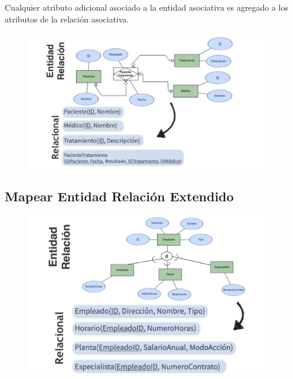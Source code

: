 \documentclass[12pt, fleqn]{report}                             %
\theoremstyle{break}                                            %
\begin{document}
                Cualquier atributo adicional asociado a la entidad asociativa es agregado a los atributos de
                la relación asociativa.

                \begin{figure}[h]
                    \centering
                    \includegraphics[width=0.95\textwidth]{MapeoRelacionesNArias}
                \end{figure}


            \clearpage
            \subsection{Mapear Entidad Relación Extendido}

                \begin{figure}[h]
                    \centering
                    \includegraphics[width=0.95\textwidth]{MapeoEntidadRelacionExtendido}
                \end{figure}
\end{document}
